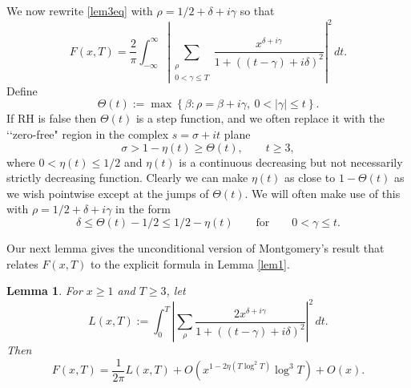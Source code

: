 \documentclass{amsart}
\newcommand{\1}{\mathbbm{1}}
\newtheorem{lem}{Lemma}
\theoremstyle{remark}
\numberwithin{equation}{section}
\begin{document}
We now rewrite \eqref{lem3eq} with $\rho = 1/2+\delta +i\gamma$ so that
\begin{equation}\label{lem3eq2} F(x,T) = \frac{2}{\pi} \int_{-\infty}^{\infty} \left|\sum_{\substack{\rho \\ 0<\gamma \le T}} \frac{x^{\delta+i\gamma}}{1+ \left((t-\gamma)+i\delta\right)^2} \right|^2 \, dt. \end{equation}
Define 
\begin{equation}\label{Theta(t)} \Theta(t) := \max\left\{\beta : \rho = \beta +i\gamma,\ 0<|\gamma|\le t\right\}. \end{equation}
If RH is false then $\Theta(t)$ is a step function, and we often replace it with the \lq \lq zero-free" region in the complex $s=\sigma +i t$ plane
\begin{equation}\label{eta-zerofree} \sigma> 1-\eta(t) \ge \Theta(t), \qquad t\ge 3,\end{equation}
where $0<\eta(t)\le 1/2$ and $\eta(t)$ is a continuous decreasing but not necessarily strictly decreasing function. Clearly we can make $\eta(t)$ as close to $1-\Theta(t)$ as we wish pointwise except at the jumps of $\Theta(t)$. 
We will often make use of this with $\rho = 1/2+\delta + i\gamma$ in the form
\begin{equation}\label{delta-Theta} \delta \le \Theta(t)-1/2 \le 1/2-\eta(t) \qquad \text{for} \qquad 0<\gamma \le t.\end{equation}

Our next lemma gives the unconditional version of Montgomery's result that relates $F(x,T)$ to the explicit formula in Lemma \ref{lem1}.

\begin{lem}\label{lem4}
For $x\ge 1$ and $T\ge 3$, let 
\begin{equation}\label{L(x,T)} L(x,T) := \int_{0}^{T} \left|\sum_\rho \frac{2x^{\delta+i\gamma}}{1+ \left((t-\gamma)+i\delta\right)^2} \right|^2 \, dt. \end{equation}
Then
\begin{equation}\label{lem4eq} F(x,T) = \frac1{2\pi} L(x,T) + O\left( x^{1-2\eta(T\log^2T)}\log^3 T\right)+O(x). \end{equation}
\end{lem}
\end{document}
